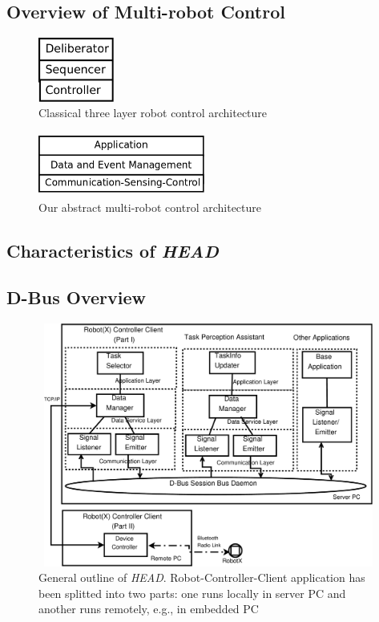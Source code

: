 \documentclass{ifacconf}
\begin{document}
\subsection{Overview of Multi-robot Control}
\begin{figure}
\begin{center}
\includegraphics[width=2.5cm,height=2.1cm]{./dia-files/three-layer-arch}    %
\caption{Classical three layer robot control architecture \cite{Gat1997}} 
\label{fig:abstract-arch}
\end{center}
\end{figure}
\begin{figure}
\begin{center}
\includegraphics[width=5.5cm,height=2.1cm]{./dia-files/abstract-arch}    %
\caption{Our abstract multi-robot control architecture} 
\label{fig:abstract-arch}
\end{center}
\end{figure}
\subsection{Characteristics of {\em HEAD}}
\subsection{D-Bus Overview}
\begin{figure}
\begin{center}
\includegraphics[width=12cm,height=8cm]{./dia-files/concrete-arch}    %
\caption{General outline of {\em HEAD}. Robot-Controller-Client application has been splitted into two parts: one runs locally in server PC and another runs remotely, e.g., in embedded PC} 
\label{fig:abstract-arch}
\end{center}
\end{figure}
\end{document}
